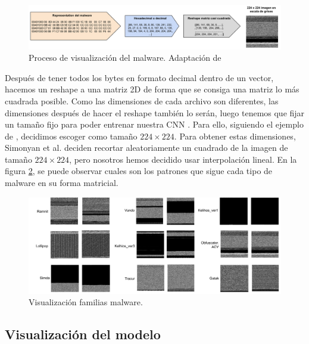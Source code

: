 \begin{figure}[h]
    \begin{center}
    \includegraphics[width=\textwidth]{img/visualMalware.png}
    \end{center}
    \caption{Proceso de visualización del malware. Adaptación de \citep{nataraj2011malware}}
    \label{img: visualMalware}
\end{figure}

Después de tener todos los bytes en formato decimal dentro de un vector, hacemos un reshape a una matriz 2D de forma que se consiga una matriz lo más cuadrada posible. Como las dimensiones de cada archivo son diferentes, las dimensiones después de hacer el reshape también lo serán, luego tenemos que fijar un tamaño fijo para poder entrenar nuestra CNN \citep{kumar2021mcft}. Para ello, siguiendo el ejemplo de \citep{kalash2018malware}, decidimos escoger como tamaño $224 \times 224$. Para obtener estas dimensiones, Simonyan et al. \citep{simonyan2014very} deciden recortar aleatoriamente un cuadrado de la imagen de tamaño $224 \times 224$, pero nosotros hemos decidido usar interpolación lineal. En la figura \ref{img: visualFamilias}, se puede observar cuales son los patrones que sigue cada tipo de malware en su forma matricial.

\begin{figure}[h]
    \begin{center}
    \includegraphics[width=\textwidth]{img/visualFamilias.png}
    \end{center}
    \caption{Visualización familias malware.}
    \label{img: visualFamilias}
\end{figure}


\subsection{Visualización del modelo}


